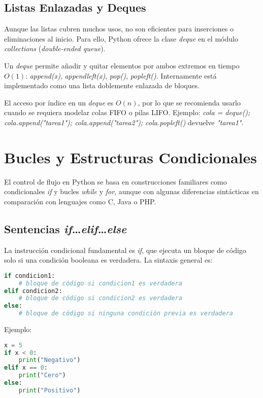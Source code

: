 \subsection*{Listas Enlazadas y Deques}
Aunque las listas cubren muchos usos, no son eficientes para inserciones o eliminaciones al inicio.  
Para ello, Python ofrece la clase \textit{deque} en el módulo \textit{collections} 
(\textit{double-ended queue}).  

Un \textit{deque} permite añadir y quitar elementos por ambos extremos en tiempo $O(1)$:  
\textit{append(x)}, \textit{appendleft(x)}, \textit{pop()}, \textit{popleft()}.  
Internamente está implementado como una lista doblemente enlazada de bloques.  

El acceso por índice en un \textit{deque} es $O(n)$, por lo que se recomienda usarlo 
cuando se requiera modelar colas FIFO o pilas LIFO.  
Ejemplo:  
\textit{cola = deque(); cola.append("tarea1"); cola.append("tarea2"); cola.popleft()} 
devuelve \textit{"tarea1"}.  

\section{Bucles y Estructuras Condicionales}

El control de flujo en Python se basa en construcciones familiares como 
condicionales \textit{if} y bucles \textit{while} y \textit{for}, 
aunque con algunas diferencias sintácticas en comparación con lenguajes como 
C, Java o PHP.

\subsection*{Sentencias \textit{if}…\textit{elif}…\textit{else}}

La instrucción condicional fundamental es \textit{if}, que ejecuta un bloque de código 
solo si una condición booleana es verdadera. La sintaxis general es:

\begin{lstlisting}[language=Python, caption={Estructura condicional en Python.}]
if condicion1:
    # bloque de código si condicion1 es verdadera
elif condicion2:
    # bloque de código si condicion2 es verdadera
else:
    # bloque de código si ninguna condición previa es verdadera
\end{lstlisting}

Ejemplo:

\begin{lstlisting}[language=Python, caption={Ejemplo de uso de if-elif-else.}]
x = 5
if x < 0:
    print("Negativo")
elif x == 0:
    print("Cero")
else:
    print("Positivo")
\end{lstlisting}


